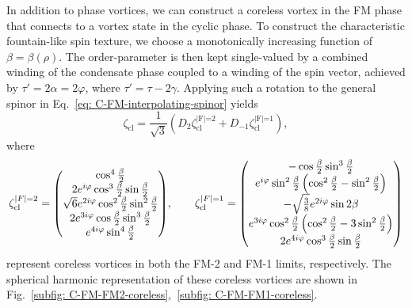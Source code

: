 In addition to phase vortices, we can construct a coreless vortex in the FM
phase that connects to a vortex state in the cyclic phase.
To construct the characteristic fountain-like spin texture, we choose a
monotonically increasing function of \(\beta=\beta(\rho)\).
The order-parameter is then kept single-valued by a combined winding of the
condensate phase coupled to a winding of the spin vector, achieved by
\(\tau'=2\alpha=2\varphi \), where \(\tau'=\tau-2\gamma \).
Applying such a rotation to the general spinor in
Eq.~\eqref{eq: C-FM-interpolating-spinor} yields
\begin{equation}\label{eq: C-FM-coreless-general}
    \zeta_\text{cl} = \frac{1}{\sqrt{3}}\left(D_2\zeta^\text{|F|=2}_\text{cl}
    + D_{-1}\zeta^\text{|F|=1}_\text{cl}\right),
\end{equation}
where
\begin{equation}\label{eq: C-FM-coreless-FM-limits}
    \zeta^{|F|=2}_\text{cl} =
    \mqty(
    \cos^4\frac{\beta}{2} \\
    2e^{i\varphi}\cos^3\frac{\beta}{2}\sin\frac{\beta}{2} \\
    \sqrt{6}e^{2i\varphi}\cos^2\frac{\beta}{2}\sin^2\frac{\beta}{2} \\
    2e^{3i\varphi}\cos\frac{\beta}{2}\sin^3\frac{\beta}{2} \\
    e^{4i\varphi}\sin^4\frac{\beta}{2}
    ), \qquad
    \zeta^{|F|=1}_\text{cl} =
    \mqty(
    -\cos\frac{\beta}{2}\sin^3\frac{\beta}{2} \\
    e^{i\varphi}\sin^2\frac{\beta}{2}\left(\cos^2\frac{\beta}{2}
    -\sin^2\frac{\beta}{2}\right) \\
    -\sqrt{\frac{3}{8}}e^{2i\varphi}\sin2\beta \\
    e^{3i\varphi}\cos^2\frac{\beta}{2}\left(\cos^2\frac{\beta}{2}
    -3\sin^2\frac{\beta}{2}\right) \\
    2e^{4i\varphi}\cos^3\frac{\beta}{2}\sin\frac{\beta}{2}
    )
\end{equation}
represent coreless vortices in both the FM-2 and FM-1 limits, respectively.
The spherical harmonic representation of these coreless vortices are shown
in Fig.~\ref{subfig: C-FM-FM2-coreless},~\ref{subfig: C-FM-FM1-coreless}.
